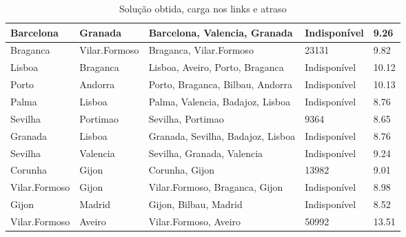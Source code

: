 \begin{table}[!htb]
{\begin{tabular}{|l|l|l|l|l|}
Barcelona & Granada & Barcelona, Valencia, Granada & Indisponível & 9.26 \\ \hline
Braganca & Vilar.Formoso & Braganca, Vilar.Formoso & 23131 & 9.82 \\ \hline
Lisboa & Braganca & Lisboa, Aveiro, Porto, Braganca & Indisponível & 10.12 \\ \hline
Porto & Andorra & Porto, Braganca, Bilbau, Andorra & Indisponível & 10.13 \\ \hline
Palma & Lisboa & Palma, Valencia, Badajoz, Lisboa & Indisponível & 8.76 \\ \hline
Sevilha & Portimao & Sevilha, Portimao & 9364 & 8.65 \\ \hline
Granada & Lisboa & Granada, Sevilha, Badajoz, Lisboa & Indisponível & 8.76 \\ \hline
Sevilha & Valencia & Sevilha, Granada, Valencia & Indisponível & 9.24 \\ \hline
Corunha & Gijon & Corunha, Gijon & 13982 & 9.01 \\ \hline
Vilar.Formoso & Gijon & Vilar.Formoso, Braganca, Gijon & Indisponível & 8.98 \\ \hline
Gijon & Madrid & Gijon, Bilbau, Madrid & Indisponível & 8.52 \\ \hline
Vilar.Formoso & Aveiro & Vilar.Formoso, Aveiro & 50992 & 13.51 \\ \hline
\end{tabular}}
\caption[]{Solução obtida, carga nos links e atraso}
\end{table}

\begin{table}[!htb]
        \centering
\caption[]{Solução obtida, carga nos links e atraso}
\end{table}

